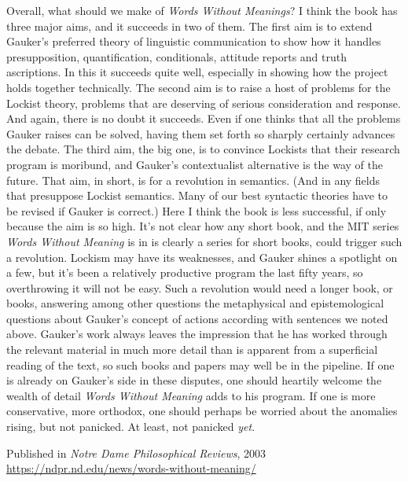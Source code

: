 \documentclass[
  10pt,
  letterpaper,
  DIV=11,
  numbers=noendperiod,
  twoside]{scrartcl}
\begin{document}
Overall, what should we make of \emph{Words Without Meanings}? I think
the book has three major aims, and it succeeds in two of them. The first
aim is to extend Gauker's preferred theory of linguistic communication
to show how it handles presupposition, quantification, conditionals,
attitude reports and truth ascriptions. In this it succeeds quite well,
especially in showing how the project holds together technically. The
second aim is to raise a host of problems for the Lockist theory,
problems that are deserving of serious consideration and response. And
again, there is no doubt it succeeds. Even if one thinks that all the
problems Gauker raises can be solved, having them set forth so sharply
certainly advances the debate. The third aim, the big one, is to
convince Lockists that their research program is moribund, and Gauker's
contextualist alternative is the way of the future. That aim, in short,
is for a revolution in semantics. (And in any fields that presuppose
Lockist semantics. Many of our best syntactic theories have to be
revised if Gauker is correct.) Here I think the book is less successful,
if only because the aim is so high. It's not clear how any short book,
and the MIT series \emph{Words Without Meaning} is in is clearly a
series for short books, could trigger such a revolution. Lockism may
have its weaknesses, and Gauker shines a spotlight on a few, but it's
been a relatively productive program the last fifty years, so
overthrowing it will not be easy. Such a revolution would need a longer
book, or books, answering among other questions the metaphysical and
epistemological questions about Gauker's concept of actions according
with sentences we noted above. Gauker's work always leaves the
impression that he has worked through the relevant material in much more
detail than is apparent from a superficial reading of the text, so such
books and papers may well be in the pipeline. If one is already on
Gauker's side in these disputes, one should heartily welcome the wealth
of detail \emph{Words Without Meaning} adds to his program. If one is
more conservative, more orthodox, one should perhaps be worried about
the anomalies rising, but not panicked. At least, not panicked
\emph{yet}.



\noindent Published in \emph{Notre Dame Philosophical Reviews}, 2003 \\
\url{https://ndpr.nd.edu/news/words-without-meaning/}
\end{document}
